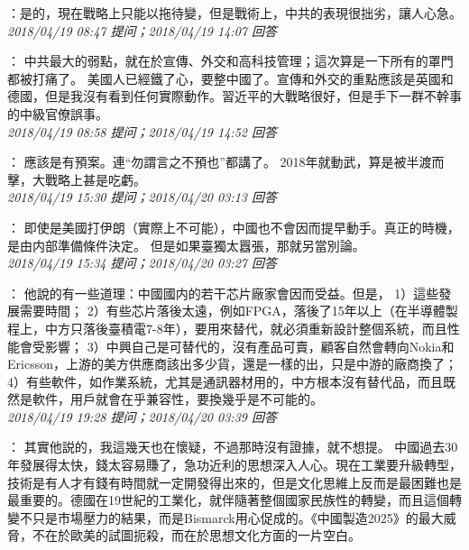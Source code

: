 \documentclass[twocolumn]{ctexart}
\begin{document}
：是的，現在戰略上只能以拖待變，但是戰術上，中共的表現很拙劣，讓人心急。
\\

\textit{\hfill\noindent\small 2018/04/19 08:47 提问；2018/04/19 14:07 回答}

：
中共最大的弱點，就在於宣傳、外交和高科技管理；這次算是一下所有的罩門都被打痛了。 
美國人已經鐵了心，要整中國了。宣傳和外交的重點應該是英國和德國，但是我沒有看到任何實際動作。習近平的大戰略很好，但是手下一群不幹事的中級官僚誤事。
\\

\textit{\hfill\noindent\small 2018/04/19 08:58 提问；2018/04/19 14:52 回答}

：
應該是有預案。連“勿謂言之不預也”都講了。 
2018年就動武，算是被半渡而擊，大戰略上甚是吃虧。
\\

\textit{\hfill\noindent\small 2018/04/19 15:30 提问；2018/04/20 03:13 回答}

：
即使是美國打伊朗（實際上不可能），中國也不會因而提早動手。真正的時機，是由内部準備條件決定。
但是如果臺獨太囂張，那就另當別論。
\\

\textit{\hfill\noindent\small 2018/04/19 15:34 提问；2018/04/20 03:27 回答}

：
他說的有一些道理：中國國内的若干芯片廠家會因而受益。但是， 
1）這些發展需要時間； 
2）有些芯片落後太遠，例如FPGA，落後了15年以上（在半導體製程上，中方只落後臺積電7-8年），要用來替代，就必須重新設計整個系統，而且性能會受影響； 
3）中興自己是可替代的，沒有產品可賣，顧客自然會轉向Nokia和Ericsson，上游的美方供應商該出多少貨，還是一樣的出，只是中游的廠商換了； 
4）有些軟件，如作業系統，尤其是通訊器材用的，中方根本沒有替代品，而且既然是軟件，用戶就會在乎兼容性，要換幾乎是不可能的。
\\

\textit{\hfill\noindent\small 2018/04/19 19:28 提问；2018/04/20 03:39 回答}

：
其實他説的，我這幾天也在懷疑，不過那時沒有證據，就不想提。 
中國過去30年發展得太快，錢太容易賺了，急功近利的思想深入人心。現在工業要升級轉型，技術是有人才有錢有時間就一定開發得出來的，但是文化思維上反而是最困難也是最重要的。德國在19世紀的工業化，就伴隨著整個國家民族性的轉變，而且這個轉變不只是市場壓力的結果，而是Bismarck用心促成的。《中國製造2025》的最大威脅，不在於歐美的試圖扼殺，而在於思想文化方面的一片空白。
\\
\end{document}
